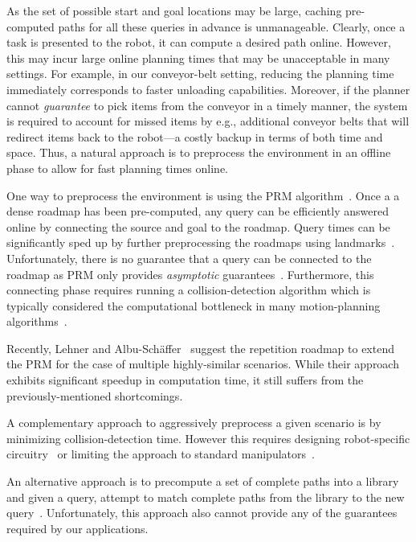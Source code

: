 \documentclass[letterpaper, 10 pt, conference]{ieeeconf}  %
\begin{document}
As the set of possible start and goal locations may be large, caching pre-computed paths for all these queries in advance is unmanageable. 
Clearly, once a task is presented to the robot, it can compute a desired path online.
However, this may incur large online planning times that may be unacceptable in many settings.
For example, in our conveyor-belt setting, reducing the planning time immediately corresponds to faster unloading capabilities. 
Moreover, if the planner cannot \emph{guarantee} to pick items from the conveyor in a timely manner, the system is required to account for missed items by e.g., additional conveyor belts that will redirect items back to the robot---a costly backup in terms of both time and space.
Thus, a natural approach is to preprocess the environment in an offline phase to allow for fast planning times online.

One way to preprocess the environment is using the \textsf{PRM} algorithm~\cite{kavraki1996probabilistic}.
Once a a dense roadmap has been pre-computed, any query can be efficiently answered online by connecting the source and goal to the roadmap. 
Query times can be significantly sped up by further preprocessing the roadmaps using landmarks~\cite{paden2017landmark}.
Unfortunately, there is no guarantee that a query can be connected to the roadmap as \textsf{PRM} only provides \emph{asymptotic} guarantees~\cite{KKL98}.
Furthermore, this connecting phase requires running a collision-detection algorithm which is typically considered the computational bottleneck in many motion-planning algorithms~\cite{L06}.

Recently, Lehner and  Albu{-}Sch{\"{a}}ffer~\cite{LA18} suggest the repetition roadmap to extend the \textsf{PRM} for the case of multiple highly-similar scenarios.
While their approach exhibits significant speedup in computation time, it still suffers from the previously-mentioned shortcomings.

A complementary approach to aggressively preprocess a given scenario is by minimizing collision-detection time.
However this requires designing robot-specific
circuitry~\cite{MFQSK16}
or limiting the approach to standard manipulators~\cite{YMILV18}.

An alternative approach is to precompute a set of complete paths into a library and given a query, attempt to match complete paths
from the library to the new query~\cite{berenson2012robot, jetchev2013fast}.
Unfortunately, this approach also cannot provide any of the guarantees required by our applications.
\end{document}
